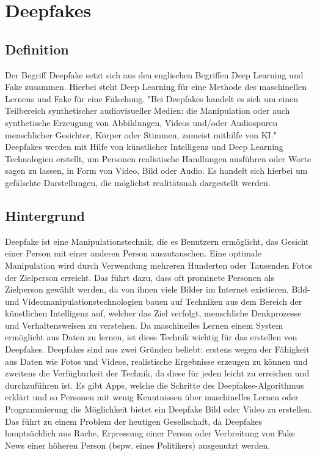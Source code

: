 \section{Deepfakes}
\subsection{Definition}
Der Begriff Deepfake setzt sich aus den englischen Begriffen Deep Learning und Fake zusammen. Hierbei steht Deep Learning für eine Methode des maschinellen Lernens und Fake für eine Fälschung.\newline
"Bei Deepfakes handelt es sich um einen Teilbereich synthetischer audiovisueller Medien: die Manipulation oder auch synthetische Erzeugung von Abbildungen, Videos und/oder Audiospuren menschlicher Gesichter, Körper oder Stimmen, zumeist mithilfe von KI."\cite{SpringerLink}
\cite{SpringerLink}
\newline
Deepfakes werden mit Hilfe von künstlicher Intelligenz und Deep Learning Technologien erstellt, um Personen realistische Handlungen ausführen oder Worte sagen zu lassen, in Form von Video, Bild oder Audio. Es handelt sich hierbei um gefälschte Darstellungen, die möglichst realitätsnah dargestellt werden.\cite{ScienceDirect}

\subsection{Hintergrund}
Deepfake ist eine Manipulationstechnik, die es Benutzern ermöglicht, das Gesicht einer Person mit einer anderen Person auszutauschen. Eine optimale Manipulation wird durch Verwendung mehreren Hunderten oder Tausenden Fotos der Zielperson erreicht. Das führt dazu, dass oft prominete Personen als Zielperson gewählt werden, da von ihnen viele Bilder im Internet existieren.\newline
Bild- und Videomanipulationstechnologien bauen auf Techniken aus dem Bereich der künstlichen Intelligenz auf, welcher das Ziel verfolgt, menschliche Denkprozesse und Verhaltensweisen zu verstehen.
Da maschinelles Lernen einem System ermöglicht aus Daten zu lernen, ist diese Technik wichtig für das erstellen von Deepfakes. \newline
Deepfakes sind aus zwei Gründen beliebt: erstens wegen der Fähigkeit aus Daten wie Fotos und Videos, realistische Ergebnisse erzeugen zu können und zweitens die Verfügbarkeit der Technik, da diese für jeden leicht zu erreichen und durchzuführen ist.
Es gibt Apps, welche die Schritte des Deepfakes-Algorithmus erklärt und so Personen mit wenig Kenntnissen über maschinelles Lernen oder Programmierung die Möglichkeit bietet ein Deepfake Bild oder Video zu erstellen. \newline
Das führt zu einem Problem der heutigen Gesellschaft, da Deepfakes hauptsächlich aus Rache, Erpressung einer Person oder Verbreitung von Fake News einer höheren Person (bspw. eines Politikers) ausgenutzt werden.\cite{Jatit}

